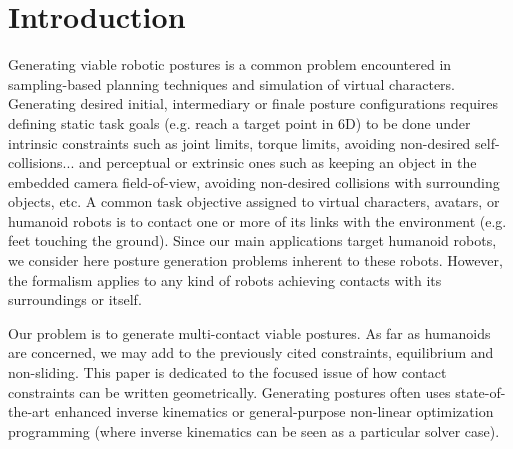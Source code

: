 \section{Introduction}
\label{sec:intro}

Generating viable robotic postures is a common problem encountered in sampling-based planning techniques and simulation of virtual characters. Generating desired initial, intermediary or finale posture configurations requires defining static task goals (e.g. reach a target point in 6D) to be done under intrinsic constraints such as joint limits, torque limits, avoiding non-desired self-collisions... and perceptual or extrinsic ones such as keeping an object in the embedded camera field-of-view, avoiding non-desired collisions with surrounding objects, etc. A common task objective assigned to virtual characters, avatars, or humanoid robots is to contact one or more of its links with the environment (e.g. feet touching the ground). Since our main applications target humanoid robots, we consider here posture generation problems inherent to these robots. However, the formalism applies to any kind of robots achieving contacts with its surroundings or itself.

Our problem is to generate multi-contact viable postures. As far as humanoids are concerned, we may add to the previously cited constraints, equilibrium and non-sliding. This paper is dedicated to the focused issue of how contact constraints can be written geometrically. Generating postures often uses state-of-the-art enhanced inverse kinematics or general-purpose non-linear optimization programming (where inverse kinematics can be seen as a particular solver case).  


